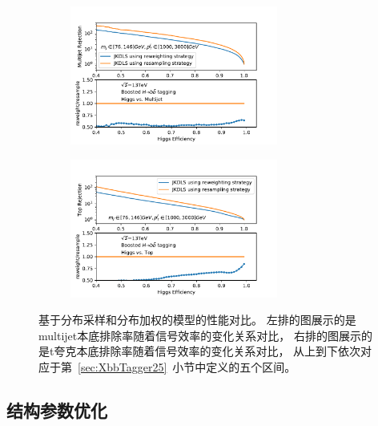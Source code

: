 \begin{figure}[htbp]
\begin{subfigure}{.5\textwidth}
   \caption{}
  \end{subfigure}
 \newline 
   \begin{subfigure}{.5\textwidth}
  \centering
   \includegraphics[width=0.75\textwidth]{figuresXbb/Reweight/QCDMASSPT3.pdf}
   \caption{}
  \end{subfigure}
  \begin{subfigure}{.5\textwidth}
  \centering
   \includegraphics[width=0.75\textwidth]{figuresXbb/Reweight/TOPMASSPT3.pdf}
   \caption{}
  \end{subfigure}
  \caption{
  基于分布采样和分布加权的模型的性能对比。
  左排的图展示的是multijet本底排除率随着信号效率的变化关系对比，
右排的图展示的是t夸克本底排除率随着信号效率的变化关系对比，
从上到下依次对应于第~\ref{sec:XbbTagger25}~小节中定义的五个区间。
  }
  \label{fig:ReweightROC}
\end{figure} 




\subsection{结构参数优化}
\label{sec:XbbTagger4}

